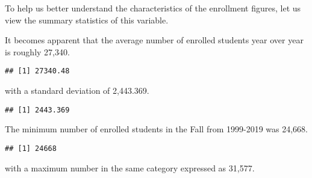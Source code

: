 \documentclass[
]{article}
\newenvironment{Shaded}{\begin{snugshade}}{\end{snugshade}}
\newcommand{\DataTypeTok}[1]{\textcolor[rgb]{0.13,0.29,0.53}{#1}}
\newcommand{\KeywordTok}[1]{\textcolor[rgb]{0.13,0.29,0.53}{\textbf{#1}}}
\newcommand{\NormalTok}[1]{#1}
\newcommand{\OperatorTok}[1]{\textcolor[rgb]{0.81,0.36,0.00}{\textbf{#1}}}
\newcommand{\OtherTok}[1]{\textcolor[rgb]{0.56,0.35,0.01}{#1}}
\begin{document}
To help us better understand the characteristics of the enrollment
figures, let us view the summary statistics of this variable.

It becomes apparent that the average number of enrolled students year
over year is roughly 27,340.

\begin{Shaded}
\end{Shaded}

\begin{verbatim}
## [1] 27340.48
\end{verbatim}

with a standard deviation of 2,443.369.

\begin{Shaded}
\end{Shaded}

\begin{verbatim}
## [1] 2443.369
\end{verbatim}

The minimum number of enrolled students in the Fall from 1999-2019 was
24,668.

\begin{Shaded}
\end{Shaded}

\begin{verbatim}
## [1] 24668
\end{verbatim}

with a maximum number in the same category expressed as 31,577.

\begin{Shaded}
\end{Shaded}
\end{document}
